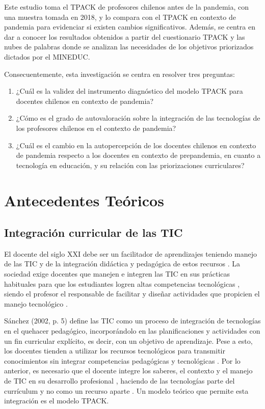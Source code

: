 \documentclass[spanish]{textolivre}
\begin{document}
Este estudio toma el TPACK de profesores chilenos antes de la pandemia, con una muestra tomada en 2018, y lo compara con el TPACK en contexto de pandemia para evidenciar si existen cambios significativos. Además, se centra en dar a conocer los resultados obtenidos a partir del cuestionario TPACK y las nubes de palabras donde se analizan las necesidades de los objetivos priorizados dictados por el MINEDUC. 

Consecuentemente, esta investigación se centra en resolver tres preguntas: 

\begin{enumerate}
    \item ¿Cuál es la validez del instrumento diagnóstico del modelo TPACK para docentes chilenos en contexto de pandemia?
    \item ¿Cómo es el grado de autovaloración sobre la integración de las tecnologías de los profesores chilenos en el contexto de pandemia?
    \item ¿Cuál es el cambio en la autopercepción de los docentes chilenos en contexto de pandemia respecto a los docentes en contexto de prepandemia, en cuanto a tecnología en educación, y su relación con las priorizaciones curriculares?
\end{enumerate}

\section{Antecedentes Teóricos}\label{sec-normas}
\subsection{Integración curricular de las TIC}
El docente del siglo XXI debe ser un facilitador de aprendizajes teniendo manejo de las TIC y de la integración didáctica y pedagógica de estos recursos \cite{del_moral_perez_formacion_2010,hernandez_nuevas_2018}. La sociedad exige docentes que manejen e integren las TIC en sus prácticas habituales para que los estudiantes logren altas competencias tecnológicas \cite{cozar_gutierrez_creando_2015,unesco_padroes_2009}, siendo el profesor el responsable de facilitar y diseñar actividades que propicien el manejo tecnológico \cite{cejas_leon_competencias_2016,unesco_uso_2013}. 

Sánchez (2002, p. 5) define las TIC como un proceso de integración de tecnologías en el quehacer pedagógico, incorporándolo en las planificaciones y actividades con un fin curricular explícito, es decir, con un objetivo de aprendizaje. Pese a esto, los docentes tienden a utilizar los recursos tecnológicos para transmitir conocimientos sin integrar competencias pedagógicas y tecnológicas \cite{cabero_formacion_2014,suarez_rodriguez_competencias_2013}.
Por lo anterior, es necesario que el docente integre los saberes, el contexto y el manejo de TIC en su desarrollo profesional \cite{cejas_leon_competencias_2016,sampaio_ensinar_2013}, haciendo de las tecnologías parte del currículum y no como un recurso aparte \cite[p. 1]{sanchez_integracion_2002}. Un modelo teórico que permite esta integración es el modelo TPACK.
\end{document}
